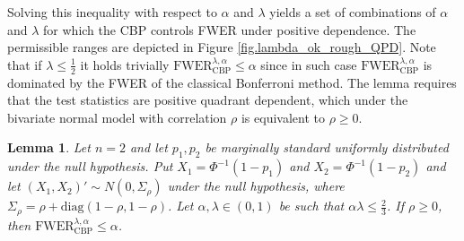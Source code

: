 \documentclass {imsart}
\newtheorem{lemma}{Lemma}
\newcommand{\FWERcb}{\mathrm{FWER}_{\mathrm{CBP}}^{\lambda,\alpha}}
\newcommand{\diag}{\mathrm{diag}}
\begin{document}
Solving this inequality with respect to $\alpha$ and $\lambda$ yields a set of combinations of $\alpha$ and $\lambda$ for which the CBP controls FWER under positive dependence. The permissible ranges are depicted in Figure \ref{fig.lambda_ok_rough_QPD}. Note that if $\lambda\leq\tfrac{1}{2}$ it holds trivially $\FWERcb\leq\alpha$ since in such case $\FWERcb$ is dominated by the FWER of the classical Bonferroni method. The lemma requires that the test statistics are positive quadrant dependent, which under the bivariate normal model with correlation $\rho$ is equivalent to $\rho\geq0$.


\begin{lemma}
\label{lem.bivariate_normal}
Let $n=2$ and let $p_1,p_2$ be marginally standard uniformly distributed under the null hypothesis. Put $X_1=\Phi^{-1}(1-p_1)$ and $X_2=\Phi^{-1}(1-p_2)$ and let $(X_1,X_2)'\sim{}N(0,\Sigma_\rho)$ under the null hypothesis, where $\Sigma_\rho=\rho+\diag(1-\rho,1-\rho)$.
Let $\alpha,\lambda\in(0,1)$ be such that $\alpha\lambda\leq\frac{2}{3}$. If $\rho\geq0$, then $\FWERcb\leq\alpha$.
\end{lemma}
\end{document}
